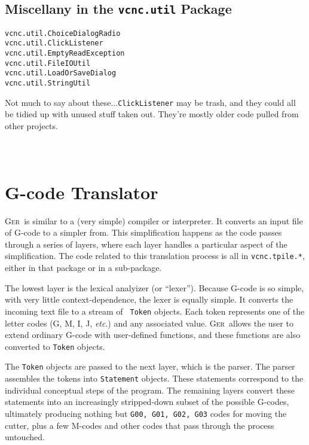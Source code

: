 \documentclass[titlepage,oneside,10pt]{article}
\newcommand{\ger}{\textsc{Ger}}
\begin{document}
\subsection{Miscellany in the {\tt vcnc.util} Package}

\begin{verbatim}
vcnc.util.ChoiceDialogRadio
vcnc.util.ClickListener
vcnc.util.EmptyReadException
vcnc.util.FileIOUtil
vcnc.util.LoadOrSaveDialog
vcnc.util.StringUtil
\end{verbatim}

Not much to say about these...{\tt ClickListener} may be trash, and
they could all be tidied up with unused stuff taken out. They're
mostly older code pulled from other projects.

\begin{verbatim}
\end{verbatim}
\begin{verbatim}
\end{verbatim}
\begin{verbatim}
\end{verbatim}

\section{G-code Translator}

\ger\ is similar to a (very simple) compiler or interpreter. It
converts an input file of G-code to a simpler from. This
simplification happens as the code passes through a series of layers,
where each layer handles a particular aspect of the
simplification. The code related to this translation process is all in
{\tt vcnc.tpile.*}, either in that package or in a sub-package.

The lowest layer is the lexical analyizer (or ``lexer''). Because
G-code is so simple, with very little context-dependence, the lexer is
equally simple. It converts the incoming text file to a stream of {\tt
  Token} objects. Each token represents one of the letter codes (G, M,
I, J, \emph{etc}.) and any associated value. \ger\ allows the user to
extend ordinary G-code with user-defined functions, and these
functions are also converted to {\tt Token} objects.

The {\tt Token} objects are passed to the next layer, which is the
parser. The parser assembles the tokens into {\tt Statement}
objects. These statements correspond to the individual conceptual
steps of the program. The remaining layers convert these statements
into an increasingly stripped-down subset of the possible
G-codes, ultimately producing nothing but {\tt G00, G01, G02, G03}
codes for moving the cutter, plus a few M-codes and other codes that
pass through the process untouched.
\end{document}
